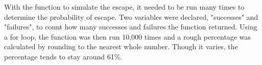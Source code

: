 \documentclass[twocolumn]{revtex4}
\begin{document}
	With the function to simulate the escape, it needed to be run many times to determine the probability of escape. Two variables were declared, "successes" and "failures", to count how many successes and failures the function returned. Using a for loop, the function was then run 10,000 times and a rough percentage was calculated by rounding to the nearest whole number. Though it varies, the percentage tends to stay around 61\%.
	
	

\end{document}
